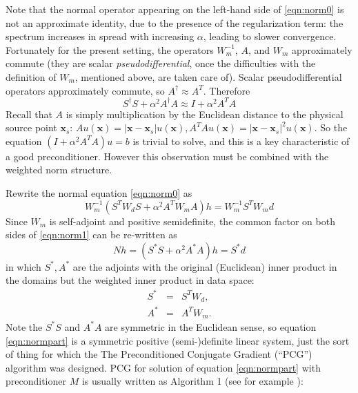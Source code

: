 \documentclass[georeport,12pt]{geophysics}
\newcommand{\bx}{\mathbf{x}}
\begin{document}
Note that the normal operator appearing on the left-hand side of
\ref{eqn:norm0} is not an approximate identity, due to the presence of
the regularization term: the spectrum increases in spread with
increasing $\alpha$, leading to slower convergence. Fortunately for
the present setting, the operators $W_m^{-1}$, $A$, and $W_m$
approximately commute (they are scalar {\em pseudodifferential}, once
the difficulties with the definition of $W_m$, mentioned above, are
taken care of). Scalar pseudodifferential operators approximately
commute, so $A^{\dagger} \approx A^T$. Therefore
\begin{equation}
  \label{eqn:normapprox}
  S^{\dagger}S + \alpha^2 A^{\dagger}A \approx I + \alpha^2A^TA
\end{equation}
Recall that $A$ is simply multiplication by the Euclidean distance to
the physical source point $\bx_s$: $A u (\bx) = |\bx-\bx_s|u(\bx),
A^TAu(\bx) = |\bx-\bx_s|^2u(\bx)$. So the equation $(I+\alpha^2
A^TA)u=b$ is trivial to solve, and this is a key characteristic of a
good preconditioner. However this observation must be combined with
the weighted norm structure.

Rewrite the normal equation \ref{eqn:norm0} as
\begin{equation}
  \label{eqn:norm1}
  W_m^{-1}(S^TW_dS + \alpha^2 A^TW_mA)h = W_m^{-1}S^TW_md 
\end{equation}
Since $W_m$ is self-adjoint and positive semidefinite, the common factor on both sides of \ref{eqn:norm1} can be re-written as
\begin{equation}
  \label{eqn:normpart}
  Nh = (S^*S + \alpha^2 A^*A)h = S^*d 
\end{equation}
in which $S^*, A^*$ are the adjoints with the original (Euclidean)
inner product in the domains but the weighted inner product in data
space:
\begin{eqnarray}
  \label{eqn:sadjwt}
  S^* &=& S^T W_d,\\
  A^* &=& A^T W_m.
\end{eqnarray}
Note the $S^*S$ and $A^*A$ are symmetric in the Euclidean sense, so
equation \ref{eqn:normpart} is a symmetric positive (semi-)definite
linear system, just the sort of thing for which the 
The Preconditioned Conjugate Gradient (``PCG'') algorithm was
designed. PCG for solution
of equation \ref{eqn:normpart} with preconditioner $M$ is usually
written as Algorithm 1 (see for example \cite{Golub:2012}):
\end{document}
